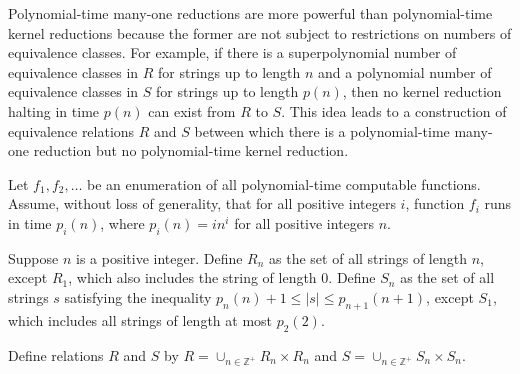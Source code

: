 

Polynomial-time many-one reductions are more powerful than polynomial-time kernel reductions because the former are not subject to restrictions on numbers of equivalence classes. %
For example, if there is a superpolynomial number of equivalence classes in $R$ for strings up to length $n$ and a polynomial number of equivalence classes in $S$ for strings up to length $p(n)$, then no kernel reduction halting in time $p(n)$ can exist from $R$ to $S$.
This idea leads to a construction of equivalence relations $R$ and $S$ between which there is a polynomial-time many-one reduction but no polynomial-time kernel reduction.

\begin{construction}\label{con:rands}
  Let $f_1, f_2, \dotsc$ be an enumeration of all polynomial-time computable functions.
  Assume, without loss of generality, that for all positive integers $i$, function $f_i$ runs in time $p_i(n)$, where $p_i(n) = i n^i$ for all positive integers $n$.

  Suppose $n$ is a positive integer.
  Define $R_n$ as the set of all strings of length $n$, except $R_1$, which also includes the string of length $0$.
  Define $S_n$ as the set of all strings $s$ satisfying the inequality $p_n(n) + 1 \leq |s| \leq p_{n + 1}(n + 1)$, except $S_1$, which includes all strings of length at most $p_2(2)$.

  Define relations $R$ and $S$ by $R = \cup_{n \in \mathbb{Z}^+} R_n \times R_n$ and $S = \cup_{n \in \mathbb{Z}^+} S_n \times S_n$.
\end{construction}

